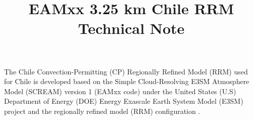 \documentclass[journal abbreviation, manuscript]{copernicus}
\begin{document}
\title{\textbf{EAMxx 3.25 km Chile RRM Technical Note}}













\received{}
\pubdiscuss{} %
\revised{}
\accepted{}
\published{}




\maketitle




\introduction
The Chile Convection-Permitting (CP) Regionally Refined Model (RRM) used for Chile is developed based on the Simple Cloud-Resolving E3SM Atmosphere Model (SCREAM) version 1 (EAMxx code) under the United States (U.S) Department of Energy (DOE) Energy Exascale Earth System Model (E3SM) project \citep{Caldwell2021} and the regionally refined model (RRM) configuration \citep{Tang2019,Tang2023,Zhang2024,Bogenschutz2024}. 
\end{document}
